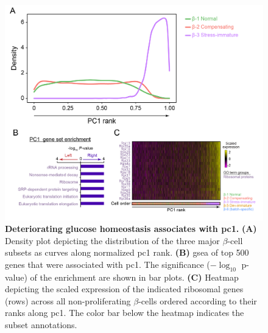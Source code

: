 \begin{figure}[t]
\centering
\includegraphics[width=\linewidth]{Chapter5/Fig/F3-6-02}
\caption[Deteriorating glucose homeostasis associates with 1]{\textbf{Deteriorating glucose homeostasis associates with \gls{pc}1.} \textbf{(A)} Density plot depicting the distribution of the three major $\beta$-cell subsets as curves along normalized \gls{pc}1 rank. \textbf{(B)} \gls{gsea} of top 500 genes that were associated with \gls{pc}1. The significance ($-\log_{10}$ p-value) of the enrichment are shown in bar plots. \textbf{(C)} Heatmap depicting the scaled expression of the indicated ribosomal genes (rows) across all non-proliferating $\beta$-cells ordered according to their ranks along \gls{pc}1. The color bar below the heatmap indicates the subset annotations.}
\label{fig:chp3_pc1}
\end{figure}



